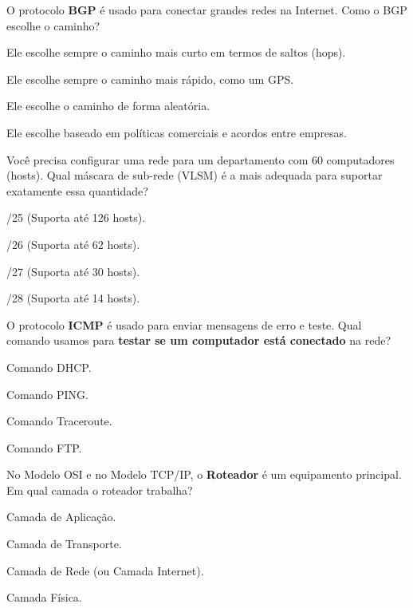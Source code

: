 \documentclass[12pt]{modelo/prova2}
\begin{document}
\question[1.0] O protocolo \textbf{BGP} é usado para conectar grandes redes na Internet. Como o BGP escolhe o caminho?
\begin{choices}
    \item Ele escolhe sempre o caminho mais curto em termos de saltos (hops).
    \item Ele escolhe sempre o caminho mais rápido, como um GPS.
    \item Ele escolhe o caminho de forma aleatória.
    \item Ele escolhe baseado em políticas comerciais e acordos entre empresas. 
\end{choices}

\question[1.0] Você precisa configurar uma rede para um departamento com 60 computadores (hosts). Qual máscara de sub-rede (VLSM) é a mais adequada para suportar exatamente essa quantidade?
\begin{choices}
    \item /25 (Suporta até 126 hosts).
    \item /26 (Suporta até 62 hosts).
    \item /27 (Suporta até 30 hosts).
    \item /28 (Suporta até 14 hosts).
\end{choices}

\question[1.0] O protocolo \textbf{ICMP} é usado para enviar mensagens de erro e teste. Qual comando usamos para \textbf{testar se um computador está conectado} na rede?
\begin{choices}
\item Comando DHCP.
\item Comando PING.
\item Comando Traceroute.
\item Comando FTP.
\end{choices}

\question[1.0] No Modelo OSI e no Modelo TCP/IP, o \textbf{Roteador} é um equipamento principal. Em qual camada o roteador trabalha?
\begin{choices}
\item Camada de Aplicação.
\item Camada de Transporte.
\item Camada de Rede (ou Camada Internet).
\item Camada Física.
\end{choices}
\end{document}
